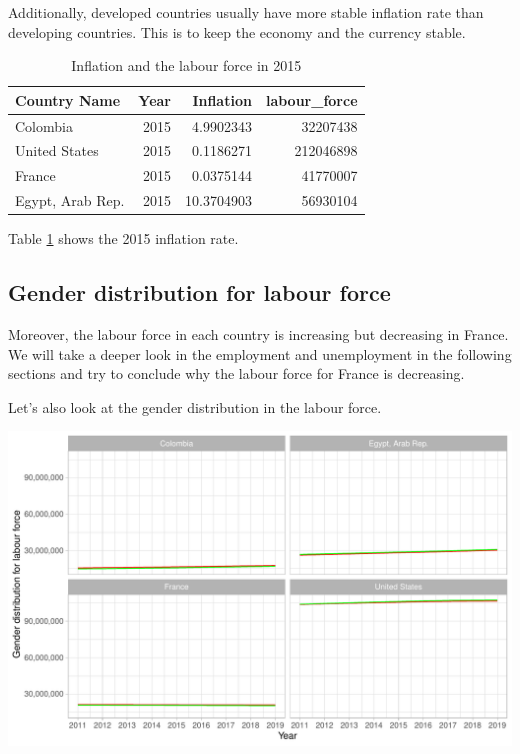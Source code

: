 \documentclass[11pt,a4paper,]{article}
\let\origfigure\figure
\let\endorigfigure\endfigure
\renewenvironment{figure}[1][2] {
    \expandafter\origfigure\expandafter[H]
} {
    \endorigfigure
}
\begin{document}
Additionally, developed countries usually have more stable inflation rate than developing countries. This is to keep the economy and the currency stable.

\begin{table}

\caption{\label{tab:A2}Inflation and the labour force in 2015}
\centering
\begin{tabular}[t]{l|r|r|r}
\hline
Country Name & Year & Inflation & labour\_force\\
\hline
Colombia & 2015 & 4.9902343 & 32207438\\
\hline
United States & 2015 & 0.1186271 & 212046898\\
\hline
France & 2015 & 0.0375144 & 41770007\\
\hline
Egypt, Arab Rep. & 2015 & 10.3704903 & 56930104\\
\hline
\end{tabular}
\end{table}

Table \ref{tab:A2} shows the 2015 inflation rate.

\hypertarget{gender-distribution-for-labour-force}{%
\subsection{Gender distribution for labour force}\label{gender-distribution-for-labour-force}}

Moreover, the labour force in each country is increasing but decreasing in France. We will take a deeper look in the employment and unemployment in the following sections and try to conclude why the labour force for France is decreasing.

Let's also look at the gender distribution in the labour force.

\begin{figure}
\centering
\includegraphics{The_Outsiders_5513_files/figure-latex/A3-1.pdf}
\caption{\label{fig:A3}Gender distribution for labour force}
\end{figure}
\end{document}
